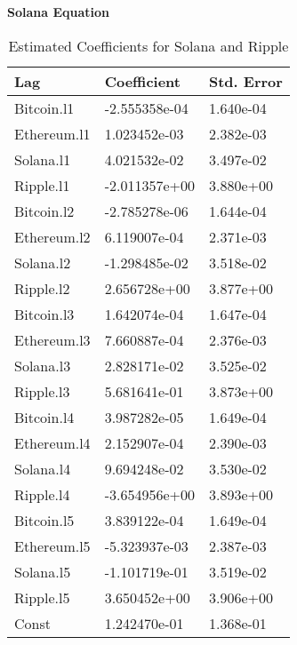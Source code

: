 \begin{table}[ht]
\centering
\caption{Estimated Coefficients for Solana and Ripple}
\begin{multicols}{2}
\noindent
\textbf{Solana Equation}
\begin{tabular}{|l|l|l|}
\hline
\textbf{Lag} & \textbf{Coefficient} & \textbf{Std. Error} \\
\hline
Bitcoin.l1     & -2.555358e-04 & 1.640e-04 \\
Ethereum.l1    & 1.023452e-03 & 2.382e-03 \\
Solana.l1      & 4.021532e-02 & 3.497e-02 \\
Ripple.l1      & -2.011357e+00 & 3.880e+00 \\
\hline
Bitcoin.l2     & -2.785278e-06 & 1.644e-04 \\
Ethereum.l2    & 6.119007e-04 & 2.371e-03 \\
Solana.l2      & -1.298485e-02 & 3.518e-02 \\
Ripple.l2      & 2.656728e+00 & 3.877e+00 \\
\hline
Bitcoin.l3     & 1.642074e-04 & 1.647e-04 \\
Ethereum.l3    & 7.660887e-04 & 2.376e-03 \\
Solana.l3      & 2.828171e-02 & 3.525e-02 \\
Ripple.l3      & 5.681641e-01 & 3.873e+00 \\
\hline
Bitcoin.l4     & 3.987282e-05 & 1.649e-04 \\
Ethereum.l4    & 2.152907e-04 & 2.390e-03 \\
Solana.l4      & 9.694248e-02 & 3.530e-02 \\
Ripple.l4      & -3.654956e+00 & 3.893e+00 \\
\hline
Bitcoin.l5     & 3.839122e-04 & 1.649e-04 \\
Ethereum.l5    & -5.323937e-03 & 2.387e-03 \\
Solana.l5      & -1.101719e-01 & 3.519e-02 \\
Ripple.l5      & 3.650452e+00 & 3.906e+00 \\
\hline
Const          & 1.242470e-01 & 1.368e-01 \\
\hline
\end{tabular}

\columnbreak


\end{multicols}
\end{table}
